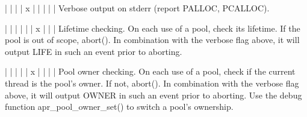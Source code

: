 \begin{DoxyPre}|   |   |   | x |   |   |   |   |  Verbose output on stderr (report
                                   PALLOC, PCALLOC).\end{DoxyPre}



\begin{DoxyPre}|   |   |   |   |   | x |   |   |  Lifetime checking. On each use of a
                                   pool, check its lifetime.  If the pool
                                   is out of scope, abort().
                                   In combination with the verbose flag
                                   above, it will output LIFE in such an
                                   event prior to aborting.\end{DoxyPre}



\begin{DoxyPre}|   |   |   |   | x |   |   |   |  Pool owner checking.  On each use of a
                                   pool, check if the current thread is the
                                   pool's owner.  If not, abort().  In
                                   combination with the verbose flag above,
                                   it will output OWNER in such an event
                                   prior to aborting.  Use the debug
                                   function apr\_pool\_owner\_set() to switch
                                   a pool's ownership.\end{DoxyPre}



